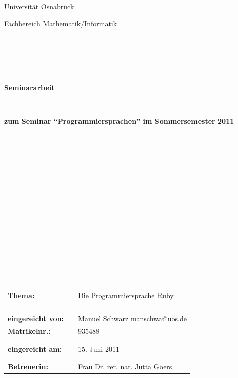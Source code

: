 \documentclass[a4paper, 11pt]{scrreprt}
\begin{document}
\thispagestyle{empty}
\begin{center}
\Large{Universität Osnabrück}\\
\end{center}


\begin{center}
\Large{Fachbereich Mathematik/Informatik}
\end{center}
\begin{verbatim}





\end{verbatim}
\begin{center}
\textbf{\LARGE{Seminararbeit}}
\end{center}
\begin{verbatim}


\end{verbatim}
\begin{center}
\textbf{zum Seminar ``Programmiersprachen'' im Sommersemester 2011}
\end{center}
\begin{verbatim}
















\end{verbatim}

\begin{flushleft}
\begin{tabular}{lll}
\textbf{Thema:} & & Die Programmiersprache Ruby\\
& & \\
& & \\
& & \\
& & \\
\textbf{eingereicht von:} & & Manuel Schwarz \flq{}manschwa@uos.de\frq{}\\
\textbf{Matrikelnr.:} & & 935488\\
& & \\
& & \\
\textbf{eingereicht am:} & & 15. Juni 2011\\
& & \\
& & \\
\textbf{Betreuerin:} & & Frau Dr. rer. nat. Jutta Göers 
\end{tabular}
\end{flushleft}
\end{document}
